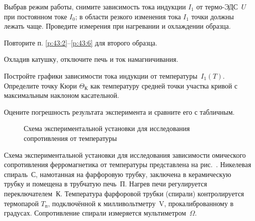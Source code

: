 \begin{lab:task}
\item \label{p:43:6}
  Выбрав режим работы, снимите зависимость тока индукции $I_1$ от термо-ЭДС~$U$
при постоянном токе $I_0$; в области резкого изменения тока $I_1$ точки 
должны лежать чаще. Проведите измерения при нагревании и охлаждении образца.

\item Повторите п. \ref{p:43:2}--\ref{p:43:6} для второго образца.
\item Охладив катушку, отключите печь и ток намагничивания.


\item Постройте графики зависимости тока индукции от температуры~$I_1(T)$. 
Определите точку Кюри $\Theta_{К}$ как температуру средней точки участка
кривой с максимальным наклоном касательной.



\item Оцените погрешность результата эксперимента и сравните его с табличным.

\end{lab:task}


\experiment

\begin{figure}[h!]
\centering
	\caption{Схема экспериментальной установки для исследования
        сопротивления от температуры}
\end{figure}
Схема экспериментальной установки для исследования зависимости омического
сопротивления ферромагнетика от температуры представлена на
рис.~. 
Никелевая спираль~С, намотанная на фарфоровую трубку, 
заключена в керамическую трубку и помещена в трубчатую печь~П. 
Нагрев печи регулируется переключателем~К. Температура фарфоровой трубки 
(спирали) контролируется термопарой $T_{\text{п}}$, подключённой к 
милливольтметру~V, прокалиброванному в градусах. Сопротивление
спирали измеряется мультиметром~$\Omega$.



